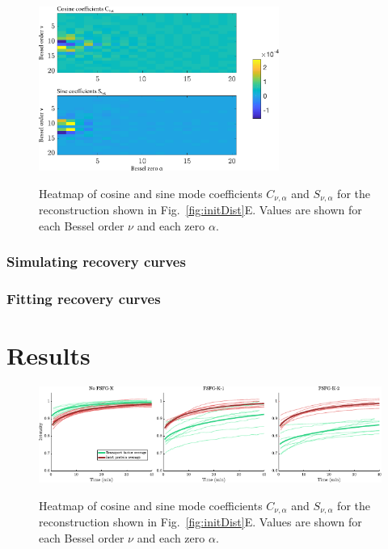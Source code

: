 \begin{figure}
\caption{Heatmap of cosine and sine mode coefficients $C_{\nu,\alpha}$ and $S_{\nu,\alpha}$ for the reconstruction shown in Fig.~\ref{fig:initDist}E. Values are shown for each Bessel order $\nu$ and each zero $\alpha$. \\}
\centering
\includegraphics[width=0.7\textwidth]{figs/ch04/rec_16_cos_sin_array_20_terms.pdf}
\label{fig:arrays}
\end{figure} 

\subsubsection{Simulating recovery curves}

\subsubsection{Fitting recovery curves}

\section{Results}

\begin{figure}
\caption{Heatmap of cosine and sine mode coefficients $C_{\nu,\alpha}$ and $S_{\nu,\alpha}$ for the reconstruction shown in Fig.~\ref{fig:initDist}E. Values are shown for each Bessel order $\nu$ and each zero $\alpha$. \\}
\centering
\includegraphics[width=\textwidth]{figs/ch04/curves}
\label{fig:curves}
\end{figure} 

